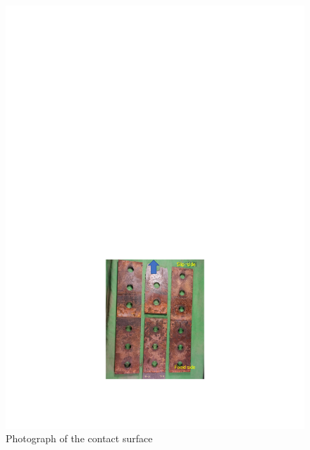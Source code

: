 \begin{figure}[htbp]
    \centering
    \begin{minipage}[t]{0.45\textwidth}
    \includegraphics[width=\linewidth]{imgs/ch3/fig3-27.pdf}
    \caption{Photograph of the contact surface}
    \label{fig3-27}
    \end{minipage}
    \begin{minipage}[t]{0.3\textwidth}

\end{minipage}
\end{figure}

